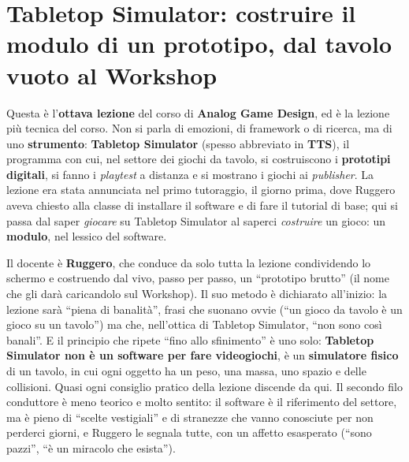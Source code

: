 \chapter[Tabletop Simulator]{Tabletop Simulator: costruire il modulo di un
prototipo, dal tavolo vuoto al Workshop}
\label{a8:cap:tts}

Questa è l'\textbf{ottava lezione} del corso di \textbf{Analog Game Design}, ed è
la lezione più tecnica del corso. Non si parla di emozioni, di framework o di
ricerca, ma di uno \textbf{strumento}: \textbf{Tabletop Simulator} (spesso abbreviato
in \textbf{TTS}), il programma con cui, nel settore dei giochi da tavolo, si
costruiscono i \textbf{prototipi digitali}, si fanno i \emph{playtest} a distanza e
si mostrano i giochi ai \emph{publisher}. La lezione era stata annunciata nel primo
tutoraggio, il giorno prima, dove Ruggero aveva chiesto alla classe di installare il
software e di fare il tutorial di base; qui si passa dal saper \emph{giocare} su
Tabletop Simulator al saperci \emph{costruire} un gioco: un \textbf{modulo}, nel
lessico del software.

Il docente è \textbf{Ruggero}, che conduce da solo tutta la lezione condividendo lo
schermo e costruendo dal vivo, passo per passo, un ``prototipo brutto'' (il nome che
gli darà caricandolo sul Workshop). Il suo metodo è dichiarato all'inizio: la
lezione sarà ``piena di banalità'', frasi che suonano ovvie (``un gioco da tavolo è
un gioco su un tavolo'') ma che, nell'ottica di Tabletop Simulator, ``non sono così
banali''. E il principio che ripete ``fino allo sfinimento'' è uno solo:
\textbf{Tabletop Simulator non è un software per fare videogiochi}, è un
\textbf{simulatore fisico} di un tavolo, in cui ogni oggetto ha un peso, una massa,
uno spazio e delle collisioni. Quasi ogni consiglio pratico della lezione discende da
qui. Il secondo filo conduttore è meno teorico e molto sentito: il software è il
riferimento del settore, ma è pieno di ``scelte vestigiali'' e di stranezze che vanno
conosciute per non perderci giorni, e Ruggero le segnala tutte, con un affetto
esasperato (``sono pazzi'', ``è un miracolo che esista'').

